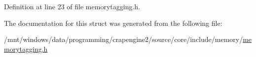 Definition at line 23 of file memorytagging.\+h.



The documentation for this struct was generated from the following file\+:\begin{DoxyCompactItemize}
\item 
/mnt/windows/data/programming/crapengine2/source/core/include/memory/\hyperlink{memorytagging_8h}{memorytagging.\+h}\end{DoxyCompactItemize}

